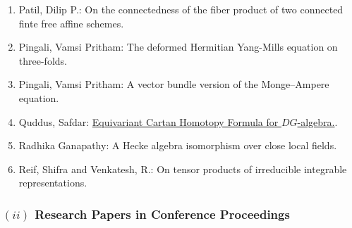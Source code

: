 \begin{enumerate}[resume, leftmargin=27pt]
	\item Patil, Dilip P.: On the connectedness of the fiber product of two connected finte free affine schemes.

	\item Pingali, Vamsi Pritham: The deformed Hermitian Yang-Mills equation on three-folds.

	\item\label{pingali:Monge-Ampere-equation} Pingali, Vamsi Pritham: A vector bundle version of the Monge--Ampere equation.

	\item Quddus, Safdar: \href{https://arxiv.org/abs/2002.02192}{Equivariant Cartan Homotopy Formula for $DG$-algebra.}.

	\item Radhika Ganapathy: A Hecke algebra isomorphism over close local fields.

	\item Reif, Shifra and Venkatesh, R.: On tensor products of irreducible integrable representations.

\end{enumerate}


\subsubsection*{{\small $(ii)$ {\sc Research Papers in Conference Proceedings}}}

\vspace{-1mm}

